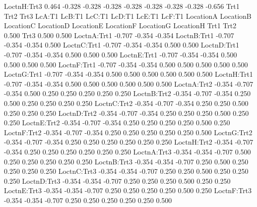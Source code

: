 \documentclass[12pt]{article}
\begin{document}
\begin{Schunk}
\begin{Soutput}
LoctnH:Trt3  0.464 -0.328 -0.328 -0.328 -0.328 -0.328 -0.328 -0.328 -0.656
            Trt1   Trt2   Trt3   LcA:T1 LcB:T1 LcC:T1 LcD:T1 LcE:T1 LcF:T1
LocationA                                                                 
LocationB                                                                 
LocationC                                                                 
LocationD                                                                 
LocationE                                                                 
LocationF                                                                 
LocationG                                                                 
LocationH                                                                 
Trt1                                                                      
Trt2         0.500                                                        
Trt3         0.500  0.500                                                 
LoctnA:Trt1 -0.707 -0.354 -0.354                                          
LoctnB:Trt1 -0.707 -0.354 -0.354  0.500                                   
LoctnC:Trt1 -0.707 -0.354 -0.354  0.500  0.500                            
LoctnD:Trt1 -0.707 -0.354 -0.354  0.500  0.500  0.500                     
LoctnE:Trt1 -0.707 -0.354 -0.354  0.500  0.500  0.500  0.500              
LoctnF:Trt1 -0.707 -0.354 -0.354  0.500  0.500  0.500  0.500  0.500       
LoctnG:Trt1 -0.707 -0.354 -0.354  0.500  0.500  0.500  0.500  0.500  0.500
LoctnH:Trt1 -0.707 -0.354 -0.354  0.500  0.500  0.500  0.500  0.500  0.500
LoctnA:Trt2 -0.354 -0.707 -0.354  0.500  0.250  0.250  0.250  0.250  0.250
LoctnB:Trt2 -0.354 -0.707 -0.354  0.250  0.500  0.250  0.250  0.250  0.250
LoctnC:Trt2 -0.354 -0.707 -0.354  0.250  0.250  0.500  0.250  0.250  0.250
LoctnD:Trt2 -0.354 -0.707 -0.354  0.250  0.250  0.250  0.500  0.250  0.250
LoctnE:Trt2 -0.354 -0.707 -0.354  0.250  0.250  0.250  0.250  0.500  0.250
LoctnF:Trt2 -0.354 -0.707 -0.354  0.250  0.250  0.250  0.250  0.250  0.500
LoctnG:Trt2 -0.354 -0.707 -0.354  0.250  0.250  0.250  0.250  0.250  0.250
LoctnH:Trt2 -0.354 -0.707 -0.354  0.250  0.250  0.250  0.250  0.250  0.250
LoctnA:Trt3 -0.354 -0.354 -0.707  0.500  0.250  0.250  0.250  0.250  0.250
LoctnB:Trt3 -0.354 -0.354 -0.707  0.250  0.500  0.250  0.250  0.250  0.250
LoctnC:Trt3 -0.354 -0.354 -0.707  0.250  0.250  0.500  0.250  0.250  0.250
LoctnD:Trt3 -0.354 -0.354 -0.707  0.250  0.250  0.250  0.500  0.250  0.250
LoctnE:Trt3 -0.354 -0.354 -0.707  0.250  0.250  0.250  0.250  0.500  0.250
LoctnF:Trt3 -0.354 -0.354 -0.707  0.250  0.250  0.250  0.250  0.250  0.500

\end{Soutput}
\end{Schunk}
\end{document}
